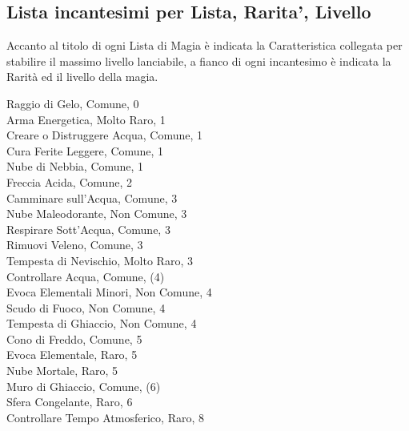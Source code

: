 \pagebreak



\subsection{Lista incantesimi per Lista, Rarita', Livello}\hypertarget{elencoscuole}{}

Accanto al titolo di ogni Lista di Magia è indicata la Caratteristica collegata per stabilire il massimo livello lanciabile, a fianco di ogni incantesimo è indicata la Rarità ed il livello della magia.

\begin{multicols}{3}


Raggio di Gelo, Comune, 0\\
Arma Energetica, Molto Raro, 1\\
Creare o Distruggere Acqua, Comune, 1\\
Cura Ferite Leggere, Comune, 1\\
Nube di Nebbia, Comune, 1\\
Freccia Acida, Comune, 2\\
Camminare sull'Acqua, Comune, 3\\
Nube Maleodorante, Non Comune, 3\\
Respirare Sott'Acqua, Comune, 3\\
Rimuovi Veleno, Comune, 3\\
Tempesta di Nevischio, Molto Raro, 3\\
Controllare Acqua, Comune, (4)\\
Evoca Elementali Minori, Non Comune, 4\\
Scudo di Fuoco, Non Comune, 4\\
Tempesta di Ghiaccio, Non Comune, 4\\
Cono di Freddo, Comune, 5\\
Evoca Elementale, Raro, 5\\
Nube Mortale, Raro, 5\\
Muro di Ghiaccio, Comune, (6)\\
Sfera Congelante, Raro, 6\\
Controllare Tempo Atmosferico, Raro, 8\\




\end{multicols}
